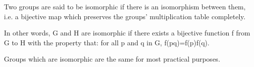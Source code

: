 Two groups are said to be isomorphic if there is an isomorphism between them, i.e. 
a bijective map which preserves the groups' multiplication table completely.
\par
In other words, G and H are isomorphic if there exists a bijective function
f from G to H with the property that: for all p and q in G, f(pq)=f(p)f(q).
\par
Groups which are isomorphic are the same for most practical purposes.